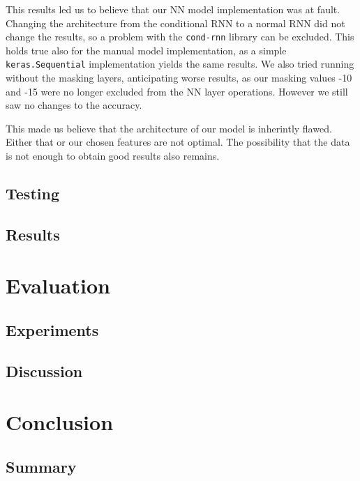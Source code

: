\documentclass[
	ngerman,
	ruledheaders=section,%
	class=report,%
	thesis={type=bachelor},%
	accentcolor=9c,%
	custommargins=true,%
	marginpar=false,%
	parskip=half-,%
	fontsize=11pt,%
]{tudapub}
\begin{document}
This results led us to believe that our NN model implementation was at fault.
Changing the architecture from the conditional RNN to a normal RNN did not change the results, so a problem with the \lstinline{cond-rnn} library can be excluded.
This holds true also for the manual model implementation, as a simple \lstinline{keras.Sequential} implementation yields the same results.
We also tried running without the masking layers, anticipating worse results, as our masking values -10 and -15 were no longer excluded from the NN layer operations.
However we still saw no changes to the accuracy.

This made us believe that the architecture of our model is inherintly flawed.
Either that or our chosen features are not optimal.
The possibility that the data is not enough to obtain good results also remains.


\section{Testing}

\section{Results}

\chapter{Evaluation}

\section{Experiments}

\section{Discussion}

\chapter{Conclusion}


\section{Summary}
\end{document}
